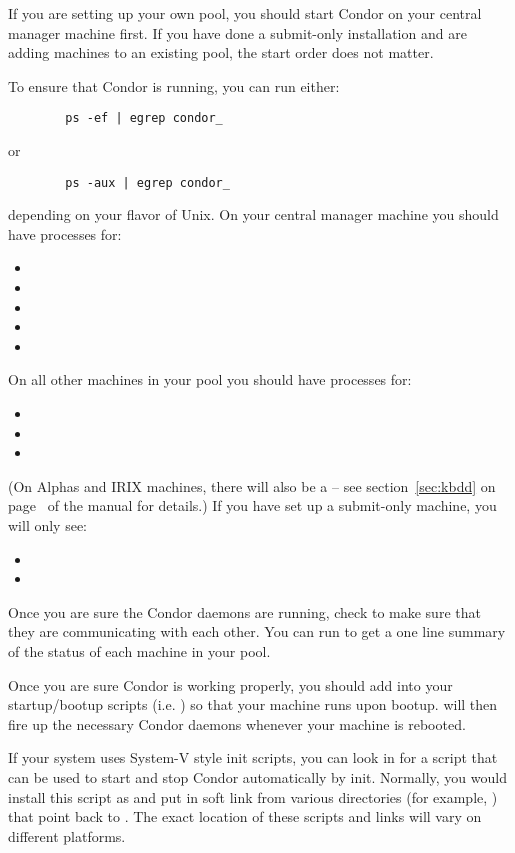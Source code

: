 If you are setting up your own pool, you should start Condor on your
central manager machine first.  If you have done a submit-only
installation and are adding machines to an existing pool,
the start order does not
matter.

To ensure that Condor is running, you can run either:
\begin{verbatim}
        ps -ef | egrep condor_
\end{verbatim}
or
\begin{verbatim}
        ps -aux | egrep condor_
\end{verbatim}
depending on your flavor of Unix.  On your central manager machine you
should have processes for:
\begin{itemize}
	\item {}
	\item {}
	\item {}
	\item {}
	\item {}
\end{itemize}
On all other machines in your pool you should have processes for:
\begin{itemize}
	\item {}
	\item {}
	\item {}
\end{itemize}
(\Note On Alphas and IRIX machines, there will also be a
	 -- see section~\ref{sec:kbdd} on
	page~\pageref{sec:kbdd} of the manual for details.)  If you
	have set up a submit-only machine, you will only see:
\begin{itemize}
	\item {}
	\item {}
\end{itemize}

Once you are sure the Condor daemons are running, check to make sure
that they are communicating with each other.  You can run
 to get a one line summary of the status of each
machine in your pool.

Once you are sure Condor is working properly, you should add
 into your startup/bootup scripts (i.e.  ) so
that your machine runs  upon bootup.  
will then fire up the necessary Condor daemons whenever your machine
is rebooted.  

If your system uses System-V style init scripts, you can look in
 for a script that can be used
to start and stop Condor automatically by init.  Normally, you would
install this script as  and put in soft link from
various directories (for example, ) that point back to
.  The exact location of these scripts and links
will vary on different platforms.


